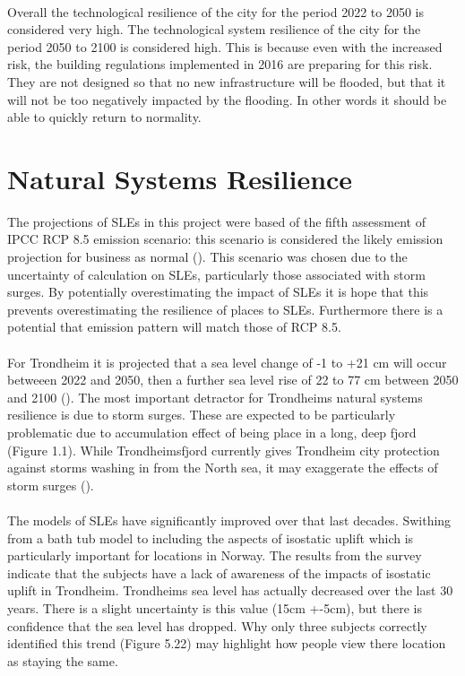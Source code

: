 \paragraph{}
Overall the technological resilience of the city for the period 2022 to 2050 is considered very high. The technological system resilience of the city for the period 2050 to 2100 is considered high. This is because even with the increased risk, the building regulations implemented in 2016 are preparing for this risk. They are not designed so that no new infrastructure will be flooded, but that it will not be too negatively impacted by the flooding. In other words it should be able to quickly return to normality. 


\section{Natural Systems Resilience}
The projections of SLEs in this project were based of the fifth assessment of IPCC RCP 8.5 emission scenario: this scenario is considered the likely emission projection for business as normal (\cite{hanssen-bauer_climate_2017}). This scenario was chosen due to the uncertainty of calculation on SLEs, particularly those associated with storm surges. By potentially overestimating the impact of SLEs it is hope that this prevents overestimating the resilience of places to SLEs. Furthermore there is a potential that emission pattern will match those of RCP 8.5. 
\paragraph{}

For Trondheim it is projected that a sea level change of -1 to +21 cm will occur betweeen 2022 and 2050, then a further sea level rise of 22 to 77 cm between 2050 and 2100 (\cite{hanssen_saksframlegg_2013}). The most important detractor for Trondheims natural systems resilience is due to storm surges. These are expected to be particularly problematic due to accumulation effect of being place in a long, deep fjord (Figure 1.1). While Trondheimsfjord currently gives Trondheim city protection against storms washing in from the North sea, it may exaggerate the effects of storm surges (\cite{hanssen_saksframlegg_2013}). 
\paragraph{}
The models of SLEs have significantly improved over that last decades. Swithing from a bath tub model to including the aspects of isostatic uplift which is particularly important for locations in Norway. The results from the survey indicate that the subjects have a lack of awareness of the impacts of isostatic uplift in Trondheim. Trondheims sea level has actually decreased over the last 30 years. There is a slight uncertainty is this value (15cm +-5cm), but there is confidence that the sea level has dropped. Why only three subjects correctly identified this trend (Figure 5.22) may highlight how people view there location as staying the same.

